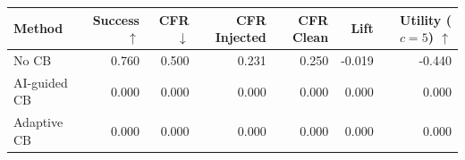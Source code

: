 \begin{tabular}{lrrrrrr}
\toprule
Method & Success $\uparrow$ & CFR $\downarrow$ & CFR Injected & CFR Clean & Lift & Utility ($c=5$) $\uparrow$ \\
\midrule
No CB & 0.760 & 0.500 & 0.231 & 0.250 & -0.019 & -0.440 \\
AI-guided CB & 0.000 & 0.000 & 0.000 & 0.000 & 0.000 & 0.000 \\
Adaptive CB & 0.000 & 0.000 & 0.000 & 0.000 & 0.000 & 0.000 \\
\bottomrule
\end{tabular}
